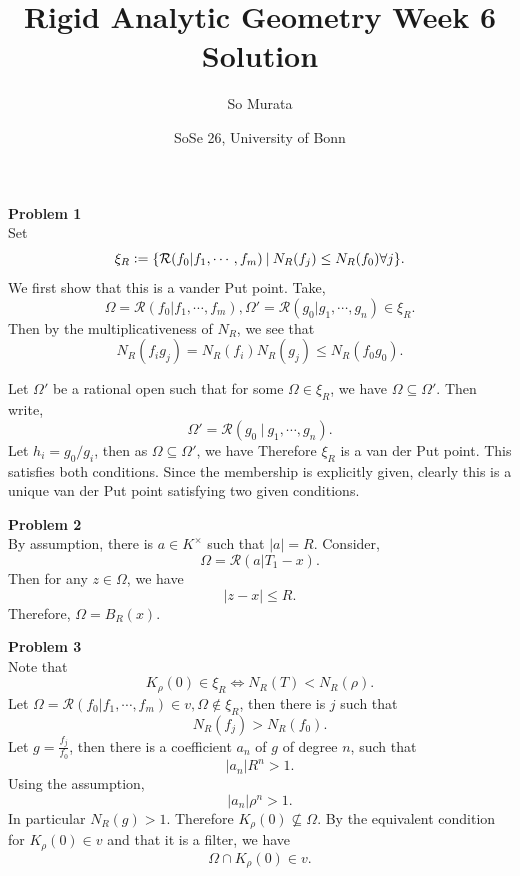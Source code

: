 \documentclass[10pt]{article}
\title{Rigid Analytic Geometry Week 6 Solution}
\author{So Murata}
\date{SoSe 26, University of Bonn}
\newcommand{\defeq}{\vcentcolon=}
\newcommand{\sep}[0]{\:|\:}
\newcommand{\ab}[1]{\vert #1 \vert}
\begin{document}
\maketitle

\par\textbf{Problem 1}\\
Set 
\begin{equation*}
    \xi_R\defeq\{\mathcal{R}(f_0|f_1,\cdots,f_m)\sep N_R(f_j)\leq N_R(f_0)\forall j\}.
\end{equation*}
We first show that this is a vander Put point. Take,
\begin{equation*}
    \Omega = \mathcal{R}(f_0|f_1,\cdots,f_m),\Omega' = \mathcal{R}(g_0|g_1,\cdots,g_n)\in \xi_R.
\end{equation*}
Then by the multiplicativeness of $N_R$, we see that 
\begin{equation*}
    N_R(f_ig_j) = N_R(f_i)N_R(g_j)\leq N_R(f_0g_0).
\end{equation*}

Let $\Omega' $ be a rational open such that for some $\Omega\in\xi_R$, we have $\Omega\subseteq\Omega'$. Then write,
\begin{equation*}
    \Omega' = \mathcal{R}(g_0\sep g_1,\cdots,g_n).
\end{equation*}
Let $h_i = g_0/g_i$, then as $\Omega\subseteq\Omega'$, we have 
Therefore $\xi_R$ is a van der Put point. This satisfies both conditions. Since the membership is explicitly given, clearly this is a unique van der Put point satisfying two given conditions.
\par\textbf{Problem 2}\\
By assumption, there is $a\in K^\times$ such that $\ab{a} = R$. Consider,
\begin{equation*}
    \Omega= \mathcal{R}(a|T_1-x).
\end{equation*}
Then for any $z\in\Omega$, we have 
\begin{equation*}
    \vert z-x\vert\leq R.
\end{equation*}
Therefore, $\Omega = B_R(x)$. 
\par\textbf{Problem 3}\\
Note that 
\begin{equation*}
    K_\rho(0)\in\xi_R\iff N_R(T)< N_R(\rho).
\end{equation*}
Let $\Omega = \mathcal{R}(f_0|f_1,\cdots,f_m)\in v,\Omega\not\in \xi_R$, then there is $j$ such that 
\begin{equation*}
    N_R(f_j)>N_R(f_0).
\end{equation*}
Let $g = {\frac {f_j} {f_0}}$, then there is a coefficient $a_n$ of $g$ of degree $n$, such that 
\begin{equation*}
    \vert a_n\vert R^n>1.
\end{equation*}
Using the assumption,
\begin{equation*}
    \vert a_n\vert \rho^n>1.
\end{equation*}
In particular $N_R(g)>1$. Therefore $K_\rho(0)\not\subseteq\Omega$. By the equivalent condition for $K_\rho(0)\in v$ and that it is a filter, we have 
\begin{equation*}
    \Omega\cap K_\rho(0)\in v.
\end{equation*}
\end{document}

